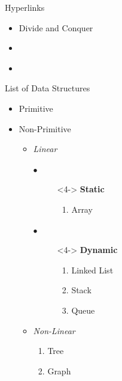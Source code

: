 \documentclass{beamer}[10pt]
\begin{document}
\begin{frame}{Hyperlinks}
\begin{itemize}
    \item Divide and Conquer
    \item \hyperlink{Algorithms}{}
    \item \hyperlink{Algorithms}{}
\end{itemize}
    
\end{frame}


\begin{frame}{List of Data Structures}
    \begin{itemize}
        \item Primitive \pause
        \item Non-Primitive \pause  \newline \\
        \begin{itemize}
            \item \textit{Linear}
            \begin{description}
                \item[$\bullet$]<4-> \textbf{Static}
                \begin{enumerate}
                    \item<5-> Array \newline
                \end{enumerate}
                \item[$\bullet$]<4-> \textbf{Dynamic}
                \begin{enumerate}
                    \item<5-> Linked List
                    \item<5-> Stack
                    \item<5-> Queue \newline
                \end{enumerate}
            \end{description}
            \item \textit{Non-Linear}
            \begin{enumerate}
                \item<6-> Tree
                \item<6-> Graph
            \end{enumerate}
        \end{itemize}
    \end{itemize}
\end{frame}
\end{document}
